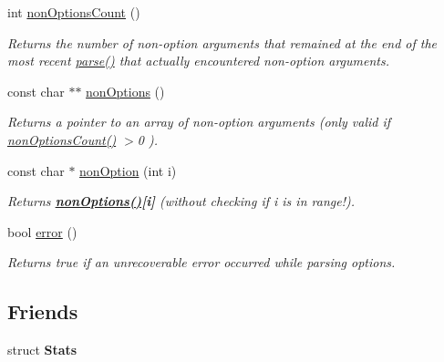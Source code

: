 \begin{DoxyCompactItemize}
int \hyperlink{classoption_1_1_parser_aa64a6a7c196993a1b20d48e8ddd12a34}{non\+Options\+Count} ()
\begin{DoxyCompactList}\small\item\em Returns the number of non-\/option arguments that remained at the end of the most recent \hyperlink{classoption_1_1_parser_a6e0b5778d1cfbd6cd51240e74d01e138}{parse()} that actually encountered non-\/option arguments. \end{DoxyCompactList}\item 
const char $\ast$$\ast$ \hyperlink{classoption_1_1_parser_a2c11b050f4248d71758dda52c5f9154d}{non\+Options} ()
\begin{DoxyCompactList}\small\item\em Returns a pointer to an array of non-\/option arguments (only valid if {\ttfamily \hyperlink{classoption_1_1_parser_aa64a6a7c196993a1b20d48e8ddd12a34}{non\+Options\+Count()} $>$0 }). \end{DoxyCompactList}\item 
\mbox{\label{classoption_1_1_parser_aeeafbf2892a5aca90b89803b2b1cb031}} 
const char $\ast$ \hyperlink{classoption_1_1_parser_aeeafbf2892a5aca90b89803b2b1cb031}{non\+Option} (int i)
\begin{DoxyCompactList}\small\item\em Returns {\bfseries {\ttfamily \hyperlink{classoption_1_1_parser_a2c11b050f4248d71758dda52c5f9154d}{non\+Options()}\mbox{[}i\mbox{]}}} ({\itshape without} checking if i is in range!). \end{DoxyCompactList}\item 
bool \hyperlink{classoption_1_1_parser_a2caa149140067b4d13e4d7a104bb3090}{error} ()
\begin{DoxyCompactList}\small\item\em Returns {\ttfamily true} if an unrecoverable error occurred while parsing options. \end{DoxyCompactList}\end{DoxyCompactItemize}
\subsection*{Friends}
\begin{DoxyCompactItemize}
\item 
\mbox{\label{classoption_1_1_parser_a7183dc3501d1c87153f9c0d41f869460}} 
struct {\bfseries Stats}
\end{DoxyCompactItemize}


